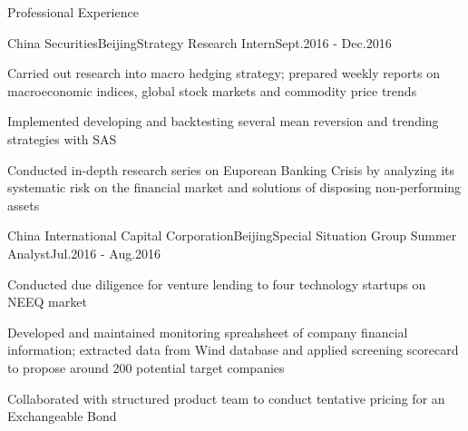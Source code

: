 \documentclass{resume02} %
\begin{document}
\begin{rSection}{Professional Experience}

\begin{rSubsection}{China Securities}{Beijing}{Strategy Research Intern}{Sept.2016 - Dec.2016}
\item Carried out research into macro hedging strategy; prepared weekly reports on macroeconomic indices, global stock markets and commodity price trends
\item Implemented developing and backtesting several mean reversion and trending strategies with SAS
\item Conducted in-depth research series on Euporean Banking Crisis by analyzing its systematic risk on the financial market and solutions of disposing non-performing assets
%
\end{rSubsection}


\begin{rSubsection}{China International Capital Corporation}{Beijing}{Special Situation Group Summer Analyst}{Jul.2016 - Aug.2016}
\item Conducted due diligence for venture lending to four technology startups on NEEQ market
\item Developed and maintained monitoring spreahsheet of company financial information; extracted data from Wind database and applied screening scorecard to propose around 200 potential target companies
\item Collaborated with structured product team to conduct tentative pricing for an Exchangeable Bond
%
\end{rSubsection}


\end{rSection}
\end{document}
